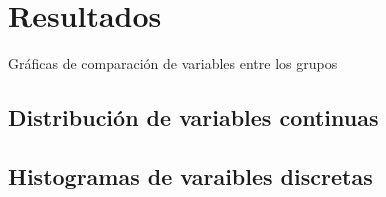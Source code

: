 \chapter{Resultados}
\noindent Gráficas de comparación de variables entre los grupos
\section{Distribución de variables continuas}
\section{Histogramas de varaibles discretas}